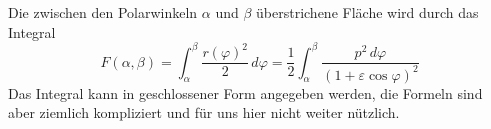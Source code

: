 Die zwischen den Polarwinkeln $\alpha$ und $\beta$ überstrichene Fläche
wird durch das Integral
\[
F(\alpha,\beta)
=
\int_\alpha^\beta
\frac{r(\varphi)^2}2
\,d\varphi
=
\frac12 \int_\alpha^\beta
\frac{p^2 \,d\varphi}{(1+\varepsilon\cos\varphi)^2}
\]
Das Integral kann in geschlossener Form angegeben werden, die Formeln
sind aber ziemlich kompliziert und für uns hier nicht weiter nützlich.



